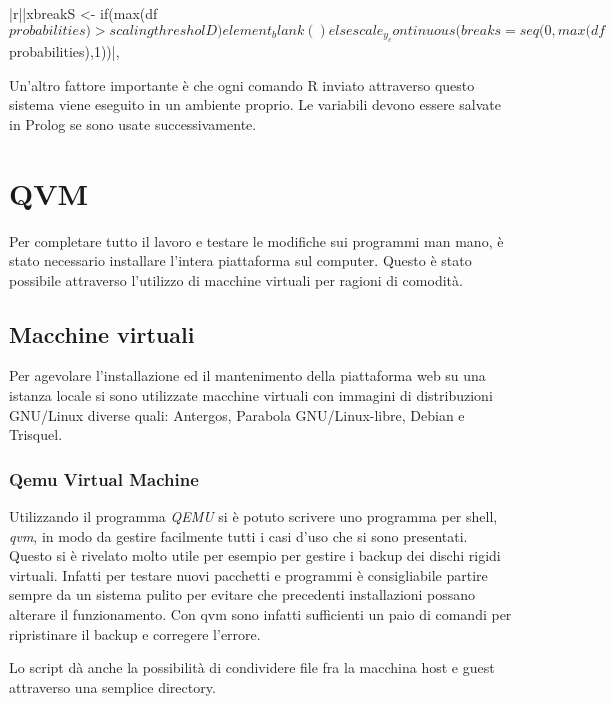 \documentclass[10pt,titlepage,twoside,a4paper]{report}
\newenvironment{code}{\singlespacing\captionsetup{type=listing}}{}
\begin{document}
\begin{code}
    \caption{Esempio di quasi quotation tratto da cplint\_r}
    \begin{rcode*}{}
{|r||xbreakS <- if(max(df$probabilities) > scalingthresholD) element_blank() else scale_y_continuous(breaks=seq(0,max(df$probabilities),1))|},
    \end{rcode*}
\end{code}

Un'altro fattore importante è che ogni comando R inviato attraverso questo 
sistema viene eseguito in un ambiente proprio. Le variabili devono essere 
salvate in Prolog se sono usate successivamente.


\section{QVM}
Per completare tutto il lavoro e testare le modifiche sui programmi man 
mano, è stato necessario installare l'intera piattaforma sul computer. 
Questo è stato possibile attraverso l'utilizzo di macchine virtuali 
per ragioni di comodità.

\subsection{Macchine virtuali}
Per agevolare l'installazione ed il mantenimento della piattaforma web su una 
istanza locale si sono utilizzate macchine virtuali con immagini di 
distribuzioni GNU/Linux diverse quali: Antergos, Parabola GNU/Linux-libre, 
Debian e Trisquel.

\subsubsection{Qemu Virtual Machine}
Utilizzando il programma \emph{QEMU}\cite{qemu} si è potuto scrivere uno 
programma per 
shell, \emph{qvm}, in modo da gestire facilmente tutti i casi d'uso che si 
sono presentati\cite{qvm}. Questo si è rivelato molto utile per esempio per 
gestire i backup dei dischi rigidi virtuali. Infatti per testare nuovi 
pacchetti e programmi è consigliabile partire sempre da un sistema pulito
per evitare che precedenti installazioni possano alterare il funzionamento.
Con qvm sono infatti sufficienti un paio di comandi per ripristinare il 
backup e corregere l'errore.

Lo script dà anche la possibilità di condividere file fra la macchina host 
e guest attraverso una semplice directory.
\end{document}
